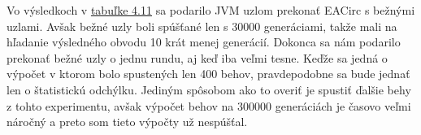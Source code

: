 Vo výsledkoch v \hyperref[tab:exp3-decim-300k]{tabuľke 4.11} sa podarilo JVM uzlom prekonať EACirc s bežnými uzlami. Avšak bežné uzly boli spúšťané len s 30000 generáciami, takže mali na hľadanie výsledného obvodu 10 krát menej generácií. Dokonca sa nám podarilo prekonať bežné uzly o jednu rundu, aj keď iba veľmi tesne. Keďže sa jedná o výpočet v ktorom bolo spustených len 400 behov, pravdepodobne sa bude jednať len o štatistickú odchýlku. Jediným spôsobom ako to overiť je spustiť ďalšie behy z tohto experimentu, avšak výpočet behov na 300000 generáciách je časovo veľmi náročný a preto som tieto výpočty už nespúšťal.





















